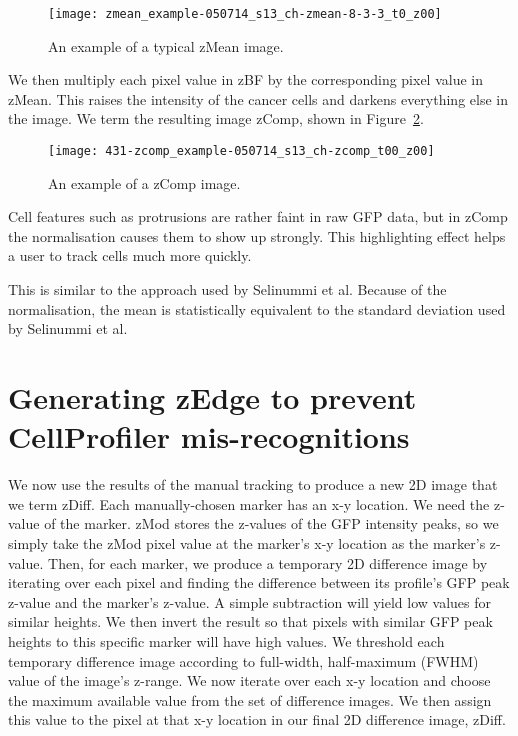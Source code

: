 \begin{figure}[htbp!]
\centering
\texttt{[image: zmean\_example-050714\_s13\_ch-zmean-8-3-3\_t0\_z00]}
\caption[zMean image example]{An example of a typical zMean image.}
\label{fig:zmean_example}
\end{figure}

We then multiply each pixel value in zBF by the corresponding pixel value in zMean. This raises the intensity of the cancer cells and darkens everything else in the image. We term the resulting image zComp, shown in Figure~\ref{fig:zcomp}.

\begin{figure}[htbp!]
\centering
\texttt{[image: 431-zcomp\_example-050714\_s13\_ch-zcomp\_t00\_z00]}
\caption[zComp image sample]{An example of a zComp image.}
\label{fig:zcomp}
\end{figure}

Cell features such as protrusions are rather faint in raw GFP data, but in zComp the normalisation causes them to show up strongly. This highlighting effect helps a user to track cells much more quickly.

This is similar to the approach used by Selinummi et al. Because of the normalisation, the mean is statistically equivalent to the standard deviation used by Selinummi et al.

\section{Generating zEdge to prevent CellProfiler mis-recognitions}

We now use the results of the manual tracking to produce a new 2D image that we term zDiff. Each manually-chosen marker has an x-y location. We need the z-value of the marker. zMod stores the z-values of the GFP intensity peaks, so we simply take the zMod pixel value at the marker's x-y location as the marker's z-value. Then, for each marker, we produce a temporary 2D difference image by iterating over each pixel and finding the difference between its profile's GFP peak z-value and the marker's z-value. A simple subtraction will yield low values for similar heights. We then invert the result so that pixels with similar GFP peak heights to this specific marker will have high values. We threshold each temporary difference image according to full-width, half-maximum (FWHM) value of the image's z-range. We now iterate over each x-y location and choose the maximum available value from the set of difference images. We then assign this value to the pixel at that x-y location in our final 2D difference image, zDiff.

